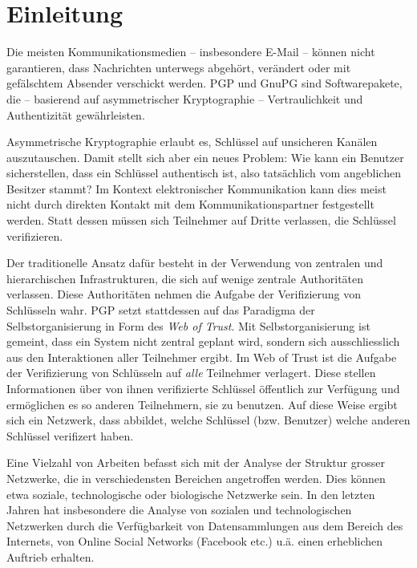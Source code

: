 
\chapter{Einleitung}
\label{ch:Einleitung}

Die meisten Kommunikationsmedien -- insbesondere E-Mail -- k\"onnen
nicht garantieren, dass Nachrichten unterwegs abgeh\"ort, ver\"andert
oder mit gef\"alschtem Absender verschickt werden. PGP und GnuPG sind
Softwarepakete, die -- basierend auf asymmetrischer Kryptographie --
Vertraulichkeit und Authentizit\"at gew\"ahrleisten.

Asymmetrische Kryptographie erlaubt es, Schl\"ussel auf unsicheren
Kan\"alen auszutauschen. Damit stellt sich aber ein neues Problem: Wie
kann ein Benutzer sicherstellen, dass ein Schl\"ussel authentisch ist,
also tats\"achlich vom angeblichen Besitzer stammt? Im Kontext
elektronischer Kommunikation kann dies meist nicht durch direkten
Kontakt mit dem Kommunikationspartner festgestellt werden. Statt
dessen m\"ussen sich Teilnehmer auf Dritte verlassen, die Schl\"ussel
verifizieren.

Der traditionelle Ansatz daf\"ur besteht in der Verwendung von
zentralen und hierarchischen Infrastrukturen, die sich auf wenige
zentrale Authorit\"aten verlassen. Diese Authorit\"aten nehmen die
Aufgabe der Verifizierung von Schl\"usseln wahr.  PGP setzt
stattdessen auf das Paradigma der Selbstorganisierung in Form des
\emph{Web of Trust}. Mit Selbstorganisierung ist gemeint, dass ein
System nicht zentral geplant wird, sondern sich ausschliesslich aus
den Interaktionen aller Teilnehmer ergibt. Im Web of Trust ist die
Aufgabe der Verifizierung von Schl\"usseln auf \emph{alle} Teilnehmer
verlagert. Diese stellen Informationen \"uber von ihnen verifizierte
Schl\"ussel \"offentlich zur Verf\"ugung und erm\"oglichen es so
anderen Teilnehmern, sie zu benutzen. Auf diese Weise ergibt sich ein
Netzwerk, dass abbildet, welche Schl\"ussel (bzw. Benutzer) welche
anderen Schl\"ussel verifizert haben.

Eine Vielzahl von Arbeiten befasst sich mit der Analyse der Struktur
grosser Netzwerke, die in verschiedensten Bereichen angetroffen
werden. Dies k\"onnen etwa soziale, technologische oder biologische
Netzwerke sein. In den letzten Jahren hat insbesondere die Analyse von
sozialen und technologischen Netzwerken durch die Verf\"ugbarkeit von
Datensammlungen aus dem Bereich des Internets, von Online Social
Networks (Facebook etc.) u.\"a. einen erheblichen Auftrieb erhalten.

